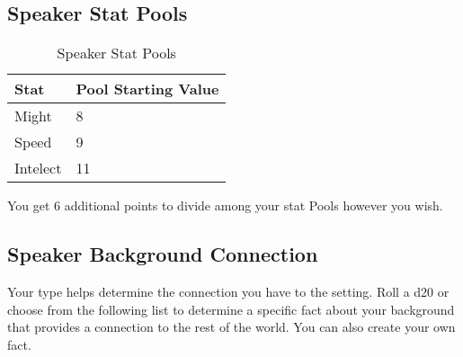 \begin{multicols}{2}
\subsection{Speaker Stat Pools}

\begin{table}[H]
\centering
\caption{Speaker Stat Pools}
\label{tab: Speaker Stat Pools}

\begin{tabularx}{\linewidth}{| X | X |}
\hline
\textbf{Stat} & \textbf{Pool Starting Value} \\
\hline
Might & 8 \\ \hline
Speed & 9 \\ \hline
Intelect & 11  \\ \hline

\end{tabularx}

\end{table}

\raggedright

You get 6 additional points to divide among your stat Pools however you wish. 

\subsection{Speaker Background Connection}

Your type helps determine the connection you have to the setting. Roll a d20 or choose from the following list to determine a specific fact about your background that provides a connection to the rest of the world. You can also create your own fact.

\end{multicols}
